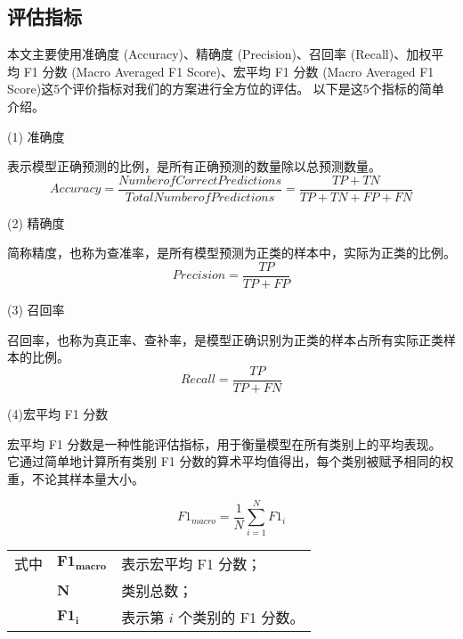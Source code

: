 \subsection{评估指标}
本文主要使用准确度 (Accuracy)、精确度 (Precision)、召回率 (Recall)、加权平均 F1 分数 (Macro Averaged F1 Score)、宏平均 F1 分数 (Macro Averaged F1 Score)这5个评价指标对我们的方案进行全方位的评估。
以下是这5个指标的简单介绍。\par
(1) 准确度\par
表示模型正确预测的比例，是所有正确预测的数量除以总预测数量。
\begin{equation}
  \label{eq:val_score1}
  Accuracy = \frac{Number of Correct Predictions}{Total Number of Predictions} = \frac{TP + TN}{TP + TN + FP + FN}
\end{equation}

(2) 精确度\par
简称精度，也称为查准率，是所有模型预测为正类的样本中，实际为正类的比例。
\begin{equation}
  \label{eq:val_score2}
  Precision = \frac{TP}{TP + FP}
\end{equation}

(3) 召回率\par
召回率，也称为真正率、查补率，是模型正确识别为正类的样本占所有实际正类样本的比例。
\begin{equation}
  \label{eq:val_score3} 
  Recall = \frac{TP}{TP + FN}
\end{equation}


(4)宏平均 F1 分数\par
宏平均 F1 分数是一种性能评估指标，用于衡量模型在所有类别上的平均表现。
它通过简单地计算所有类别 F1 分数的算术平均值得出，每个类别被赋予相同的权重，不论其样本量大小。

\begin{equation}
 \label{eq:val_score4}
F1_{macro} = \frac{1}{N} \sum\limits_{i=1}^{N} F1_i
\end{equation}
\begin{flushleft}
  \renewcommand\arraystretch{1.25}
  \begin{tabularx}{\textwidth}{@{}>{\normalsize\rm}l@{\quad}>{\normalsize\rm}l@{——}>{\normalsize\rm}X@{}}
  式中& $\symbf{F1_{macro}}$ &表示宏平均 F1 分数；\\
  &  $\symbf{N}$&类别总数；\\
  &  $\symbf{F1_i}$ & 表示第 $i$ 个类别的 F1 分数。\\
  \end{tabularx}\vspace{.5ex}%
\end{flushleft}

